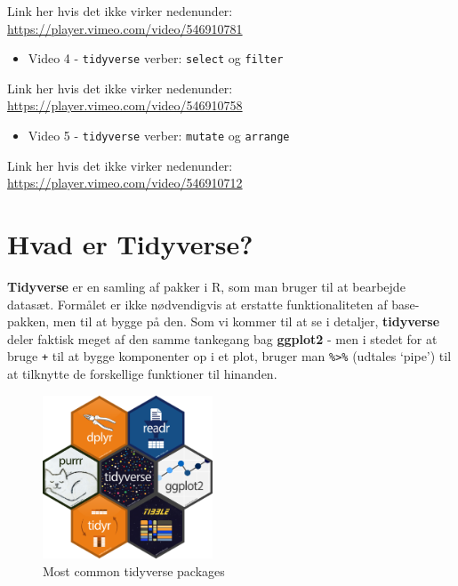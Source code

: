 \documentclass[
]{book}
\providecommand{\tightlist}{%
  \setlength{\itemsep}{0pt}\setlength{\parskip}{0pt}}
\begin{document}
Link her hvis det ikke virker nedenunder: \url{https://player.vimeo.com/video/546910781}

\begin{itemize}
\tightlist
\item
  Video 4 - \texttt{tidyverse} verber: \texttt{select} og \texttt{filter}
\end{itemize}

Link her hvis det ikke virker nedenunder: \url{https://player.vimeo.com/video/546910758}

\begin{itemize}
\tightlist
\item
  Video 5 - \texttt{tidyverse} verber: \texttt{mutate} og \texttt{arrange}
\end{itemize}

Link her hvis det ikke virker nedenunder: \url{https://player.vimeo.com/video/546910712}

\hypertarget{hvad-er-tidyverse}{%
\section{Hvad er Tidyverse?}\label{hvad-er-tidyverse}}

\textbf{Tidyverse} er en samling af pakker i R, som man bruger til at bearbejde datasæt. Formålet er ikke nødvendigvis at erstatte funktionaliteten af base-pakken, men til at bygge på den. Som vi kommer til at se i detaljer, \textbf{tidyverse} deler faktisk meget af den samme tankegang bag \textbf{ggplot2} - men i stedet for at bruge \texttt{+} til at bygge komponenter op i et plot, bruger man \texttt{\%\textgreater{}\%} (udtales `pipe') til at tilknytte de forskellige funktioner til hinanden.

\begin{figure}
\centering
\includegraphics[width=0.45\textwidth,height=\textheight]{plots/tidyverse2_packages.png}
\caption{Most common tidyverse packages}
\end{figure}
\end{document}
